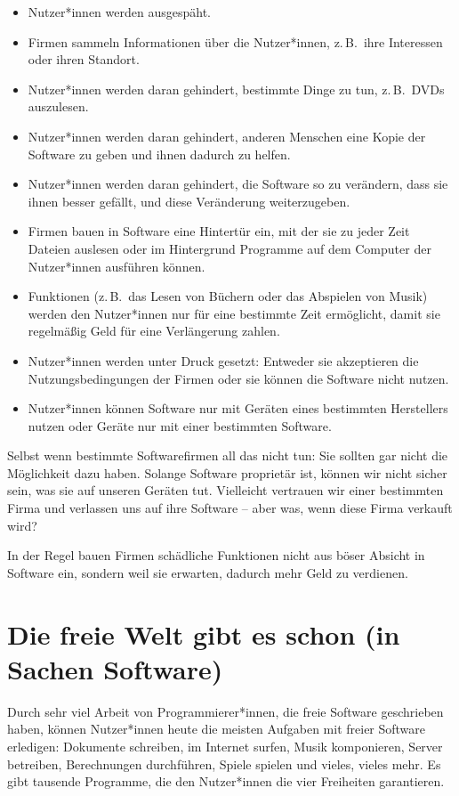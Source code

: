 \documentclass[a5paper,12pt]{scrartcl}
\begin{document}
\begin{itemize}
\item Nutzer*innen werden ausgespäht.
\item Firmen sammeln Informationen über die Nutzer*innen, z.\,B.\ ihre
  Interessen oder ihren Standort.
\item Nutzer*innen werden daran gehindert, bestimmte Dinge zu tun,
  z.\,B.\ DVDs auszulesen.
\item Nutzer*innen werden daran gehindert, anderen Menschen eine Kopie
  der Software zu geben und ihnen dadurch zu helfen.
\item Nutzer*innen werden daran gehindert, die Software so zu
  verändern, dass sie ihnen besser gefällt, und diese Veränderung
  weiterzugeben.
\item Firmen bauen in Software eine Hintertür ein, mit der sie zu
  jeder Zeit Dateien auslesen oder im Hintergrund Programme auf dem
  Computer der Nutzer*innen ausführen können.
\item Funktionen (z.\,B.\ das Lesen von Büchern oder das Abspielen von
  Musik) werden den Nutzer*innen nur für eine bestimmte Zeit
  ermöglicht, damit sie regelmäßig Geld für eine Verlängerung zahlen.
\item Nutzer*innen werden unter Druck gesetzt: Entweder sie
  akzeptieren die Nutzungsbedingungen der Firmen oder sie können die
  Software nicht nutzen.
\item Nutzer*innen können Software nur mit Geräten eines bestimmten
  Herstellers nutzen oder Geräte nur mit einer bestimmten Software.
\end{itemize}

Selbst wenn bestimmte Softwarefirmen all das nicht tun: Sie sollten
gar nicht die Möglichkeit dazu haben. Solange Software proprietär ist,
können wir nicht sicher sein, was sie auf unseren Geräten
tut. Vielleicht vertrauen wir einer bestimmten Firma und verlassen uns
auf ihre Software -- aber was, wenn diese Firma verkauft wird?

In der Regel bauen Firmen schädliche Funktionen nicht aus böser
Absicht in Software ein, sondern weil sie erwarten, dadurch mehr Geld
zu verdienen.


\section{Die freie Welt gibt es schon (in Sachen Software)}

Durch sehr viel Arbeit von Programmierer*innen, die freie Software
geschrieben haben, können Nutzer*innen heute die meisten Aufgaben mit
freier Software erledigen: Dokumente schreiben, im Internet surfen,
Musik komponieren, Server betreiben, Berechnungen durchführen, Spiele
spielen und vieles, vieles mehr. Es gibt tausende Programme, die den
Nutzer*innen die vier Freiheiten garantieren.
\end{document}
